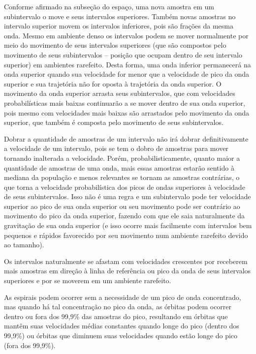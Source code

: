 Conforme afirmado na subseção do espaço, uma nova amostra em um subintervalo o move e seus intervalos superiores. Também novas amostras no intervalo superior movem os intervalos inferiores, pois são frações da mesma onda. Mesmo em ambiente denso os intervalos podem se mover normalmente por meio do movimento de seus intervalos superiores (que são compostos pelo movimento de seus subintervalos – posição que ocupam dentro de seu intervalo superior) em ambientes rarefeito.  Desta forma, uma onda inferior permanecerá na onda superior quando sua velocidade for menor que a velocidade de pico da onda superior e sua trajetória não for oposta à trajetória da onda superior. O movimento da onda superior arrasta seus subintervalos, que com velocidades probabilísticas mais baixas continuarão a se mover dentro de sua onda superior, pois mesmo com velocidades mais baixas são arrastados pelo movimento da onda superior, que também é composta pelo movimento de seus subintervalos.

Dobrar a quantidade de amostras de um intervalo não irá dobrar definitivamente a velocidade de um intervalo, pois se tem o dobro de amostras para mover tornando inalterada a velocidade. Porém, probabilisticamente, quanto maior a quantidade de amostras de uma onda, mais essas amostras estarão sentido à mediana da população e menos relevantes se tornam as amostras contrárias, o que torna a velocidade probabilística dos picos de ondas superiores à velocidade de seus subintervalos. Isso não é uma regra e um subintervalo pode ter velocidade superior ao pico de sua onda superior ou seu movimento pode ser contrário ao movimento do pico da onda superior, fazendo com que ele saia naturalmente da gravitação de sua onda superior (e isso ocorre mais facilmente com intervalos bem pequenos e rápidos favorecido por seu movimento num ambiente rarefeito devido ao tamanho). 

Os intervalos naturalmente se afastam com velocidades crescentes por receberem mais amostras em direção à linha de referência ou pico da onda de seus intervalos superiores e por se moverem em um ambiente rarefeito.

As espirais podem ocorrer sem a necessidade de um pico de onda concentrado, mas quando há tal concentração no pico da onda, as órbitas podem ocorrer dentro ou fora dos 99,9\% das amostras do pico, resultando em órbitas que mantêm suas velocidades médias constantes quando longe do pico (dentro dos 99,9\%) ou órbitas que diminuem suas velocidades quando estão longe do pico (fora dos 99,9\%).

